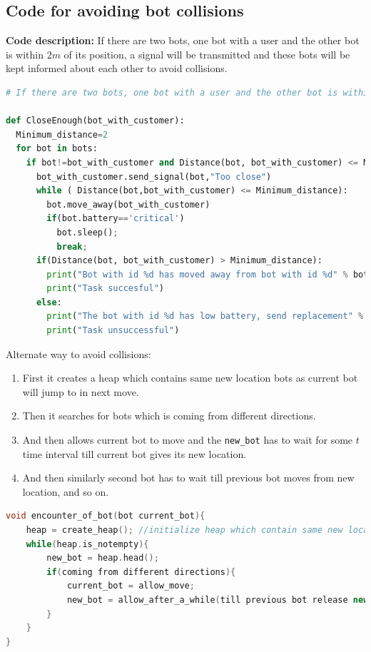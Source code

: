 \documentclass{article}
\begin{document}
\subsection{Code for avoiding bot collisions}
\label{code:i}
\textbf{Code description: }
If there are two bots, one bot with a user and the other bot is within $2m$ of its position, a signal will be transmitted and these bots will be kept informed about each other to avoid collisions.
\begin{lstlisting}[language=Python, caption=Avoiding bot collisions]
# If there are two bots, one bot with a user and the other bot is within 2m of its position and a signal will be transmitted and these bots will be kept informed about each other to avoid collisions

def CloseEnough(bot_with_customer):
  Minimum_distance=2
  for bot in bots:
    if bot!=bot_with_customer and Distance(bot, bot_with_customer) <= Minimum_distance:
      bot_with_customer.send_signal(bot,"Too close")
      while ( Distance(bot,bot_with_customer) <= Minimum_distance):
        bot.move_away(bot_with_customer)
        if(bot.battery=='critical')
          bot.sleep();
          break;
      if(Distance(bot, bot_with_customer) > Minimum_distance):
        print("Bot with id %d has moved away from bot with id %d" % bot.id() % bot_with_customer.id())
        print("Task succesful")
      else:
        print("The bot with id %d has low battery, send replacement" % bot.id())
        print("Task unsuccessful")
\end{lstlisting}
Alternate way to avoid collisions:
\begin{enumerate}
\item First it creates a heap which contains same new location bots as current bot will jump to in next move.
\item Then it searches for bots which is coming from different directions.
\item And then allows current bot to move and the \lstinline[language=C++]{new_bot} has to wait for some $t$ time interval till current bot gives its new location.
\item And then similarly second bot has to wait till previous bot moves from new location, and so on.
\end{enumerate}
\begin{lstlisting}[language=C++, caption=Avoiding bot collisions - 2]
void encounter_of_bot(bot current_bot){
    heap = create_heap(); //initialize heap which contain same new location bots as current_bot
    while(heap.is_notempty){
        new_bot = heap.head();
        if(coming from different directions){
            current_bot = allow_move;
            new_bot = allow_after_a_while(till previous bot release new location);
        }
    }
}
\end{lstlisting}
\end{document}

